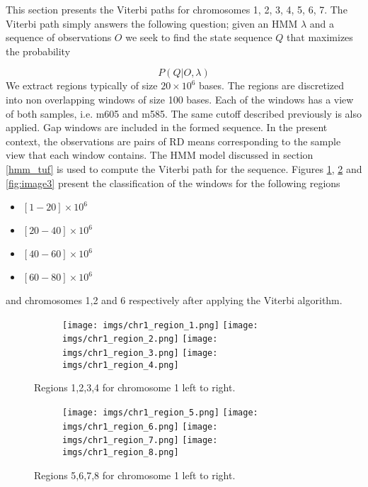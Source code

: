 This section presents the Viterbi paths for chromosomes 1, 2, 3, 4, 5, 6, 7. 
The Viterbi path simply answers the following 
question; given an HMM $\lambda$ and a sequence of observations $O$ we seek to find the state sequence  $Q$ that maximizes the probability

\begin{equation}
P(Q|O, \lambda)
\end{equation}
We extract regions typically of size $20\times 10^6$ bases. The regions are 
discretized into non overlapping  windows of size 100 bases. Each of the windows has a view of both samples, i.e. m605 and m585. 
The same cutoff described previously is also applied. Gap windows are included in the formed sequence. In the present context, the observations are pairs of RD means corresponding to the sample view that each window contains. The HMM model discussed in section \ref{hmm_tuf} is used to
compute the Viterbi path for the sequence. Figures \ref{fig:image1}, \ref{fig:image2} and \ref{fig:image3} present the classification of the windows for the following regions

\begin{itemize}
	\item $[1-20]\times 10^6$
	\item $[20-40]\times 10^6$
	\item $[40-60]\times 10^6$
	\item $[60-80]\times 10^6$
\end{itemize} 
and chromosomes 1,2 and 6 respectively after applying the Viterbi algorithm.

\begin{figure}[h]
	\begin{subfigure}{}
		\texttt{[image: imgs/chr1\_region\_1.png]}
		\texttt{[image: imgs/chr1\_region\_2.png]}
		\texttt{[image: imgs/chr1\_region\_3.png]}
		\texttt{[image: imgs/chr1\_region\_4.png]}	
	\end{subfigure}

	\caption{Regions 1,2,3,4  for chromosome 1 left to right.  }
	\label{fig:image1}
\end{figure}

\begin{figure}[h]
	\begin{subfigure}{}
		\texttt{[image: imgs/chr1\_region\_5.png]}
		\texttt{[image: imgs/chr1\_region\_6.png]}
		\texttt{[image: imgs/chr1\_region\_7.png]}
		\texttt{[image: imgs/chr1\_region\_8.png]}	
	\end{subfigure}
	
	\caption{Regions 5,6,7,8  for chromosome 1 left to right.  }
	\label{fig:image2}
\end{figure}

